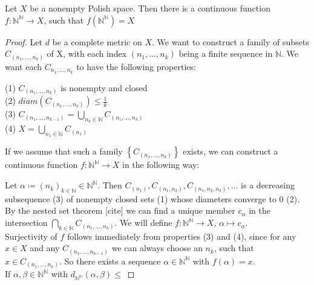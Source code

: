 \documentclass[10pt, a4paper, titlepage]{article}
\numberwithin{equation}{section}
\begin{document}
\begin{theorem}
	Let $X$ be a nonempty Polish space. Then there is a continuous function $f: \mathbb{N}^\mathbb{N} \to X $, such that $f\left( \mathbb{N}^\mathbb{N} \right) = X$
\end{theorem}
\begin{proof}
Let $d$ be a complete metric on $X$. We want to construct a family of subsets $C_{(n_1,\ldots,n_k)}$ of X, 
with each index $\left( n_1,\ldots,n_k \right) $ being a finite sequence in $\mathbb{N}$.	
We want each  $C_{n_1,\ldots,n_k}$ to have the following properties:

(1) $C_{\left( n_1,\ldots,n_k \right) }$ is nonempty and closed\\
(2) $diam \left( C_{\left( n_1,\ldots,n_k \right) } \right) \leq \frac{1}{k}$\\
(3) $C_{\left( n_1,\ldots,n_{k-1} \right) } = \bigcup_{n_k \in \mathbb{N}} C_{\left( n_1,\ldots,n_k \right) }$ \\
(4) $X = \bigcup_{n_1 \in \mathbb{N}} C_{\left( n_1 \right) }$

If we assume that such a family $\left\{ C_{\left( n_1,\ldots,n_k \right) }  \right\} $ exists, we can construct a continuous function $f: \mathbb{N}^\mathbb{N} \to X$ in the following way:

Let $\alpha \coloneq \left( n_k \right)_{k \in \mathbb{N}} \in \mathbb{N}^{\mathbb{N}}$.
Then $C_{\left( n_1 \right) }, C_{\left( n_1,n_2 \right) },C_{\left( n_1,n_2,n_3 \right) },\ldots$ is a decreasing subsequence (3) of nonempty closed sets (1) whose diameters converge to 0 (2).
By the nested set theorem [cite] we can find a unique member $c_\alpha$ in the intersection $\bigcap_{k \in \mathbb{N}} C_{\left( n_1,\ldots,n_k \right) }$.
We will define $f: \mathbb{N}^\mathbb{N} \to X$, $ \alpha \mapsto c_{\alpha}$.\\
Surjectivity of $f$ follows immediately from properties  (3) and (4), since for any $ x \in X$ and any $C_{\left( n_1,\ldots,n_{k-1} \right) }$ we can always choose an $n_k$, such that  $x \in C_{\left( n_1,\ldots,n_k \right) }$. 
So there exists a sequence $\alpha \in \mathbb{N}^\mathbb{N}$ with $f(\alpha) = x$.\\
If $\alpha,\beta \in  \mathbb{N}^\mathbb{N}$ with $d_{\mathbb{N}^\mathbb{N}}\left( \alpha,\beta \right) \leq $ 
\end{proof}
\end{document}
